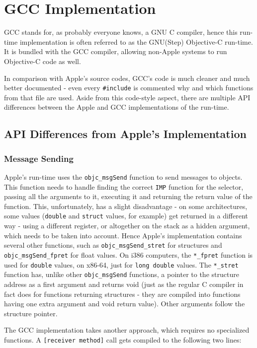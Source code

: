 \chapter{GCC Implementation}

GCC stands for, as probably everyone knows, a GNU C compiler, hence this run-time implementation is often referred to as the GNU(Step) Objective-C run-time. It is bundled with the GCC compiler, allowing non-Apple systems to run Objective-C code as well.

In comparison with Apple's source codes, GCC's code is much cleaner and much better documented - even every \verb=#include= is commented why and which functions from that file are used. Aside from this code-style aspect, there are multiple API differences between the Apple and GCC implementations of the run-time.

\section{API Differences from Apple's Implementation}
\subsection{Message Sending}
Apple's run-time uses the \verb=objc_msgSend= function to send messages to objects. This function needs to handle finding the correct \verb=IMP= function for the selector, passing all the arguments to it, executing it and returning the return value of the function. This, unfortunately, has a slight disadvantage - on some architectures, some values (\verb=double= and \verb=struct= values, for example) get returned in a different way - using a different register, or altogether on the stack as a hidden argument, which needs to be taken into account. Hence Apple's implementation contains several other functions, such as \verb=objc_msgSend_stret= for structures and \verb=objc_msgSend_fpret= for float values. On i386 computers, the \verb=*_fpret= function is used for \verb=double= values, on x86-64, just for \verb=long double= values. The \verb=*_stret= function has, unlike other \verb=objc_msgSend= functions, a pointer to the structure address as a first argument and returns void (just as the regular C compiler in fact does for functions returning structures - they are compiled into functions having one extra argument and void return value). Other arguments follow the structure pointer.

The GCC implementation takes another approach, which requires no specialized functions. A \verb=[receiver method]= call gets compiled to the following two lines:

